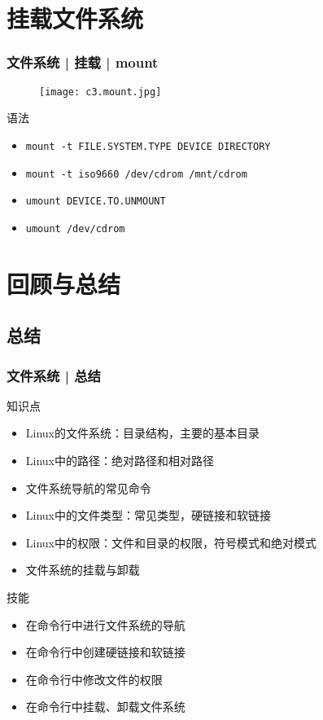 \section{挂载文件系统}
\begin{frame}[fragile]
  \frametitle{文件系统 | 挂载 | mount }
  \begin{figure}
    \centering
    \texttt{[image: c3.mount.jpg]}
  \end{figure}
  \pause
  \vspace{-0.3cm}
  \begin{block}{\alert{语法}}
    \begin{itemize}
      \item \verb|mount -t FILE.SYSTEM.TYPE DEVICE DIRECTORY|
      \item \verb|mount -t iso9660 /dev/cdrom /mnt/cdrom|
      \item \verb|umount DEVICE.TO.UNMOUNT|
      \item \verb|umount /dev/cdrom|
    \end{itemize}
  \end{block}
\end{frame}

\section{回顾与总结}
\subsection{总结}
\begin{frame}
  \frametitle{文件系统 | 总结}
  \begin{block}{知识点}
    \begin{itemize}
      \item Linux的文件系统：目录结构，主要的基本目录
      \item Linux中的路径：绝对路径和相对路径
      \item 文件系统导航的常见命令
      \item Linux中的文件类型：常见类型，硬链接和软链接
      \item Linux中的权限：文件和目录的权限，符号模式和绝对模式
      \item 文件系统的挂载与卸载
    \end{itemize}
  \end{block}
  \begin{block}{技能}
    \begin{itemize}
      \item 在命令行中进行文件系统的导航
      \item 在命令行中创建硬链接和软链接
      \item 在命令行中修改文件的权限
      \item 在命令行中挂载、卸载文件系统
    \end{itemize}
  \end{block}
\end{frame}

